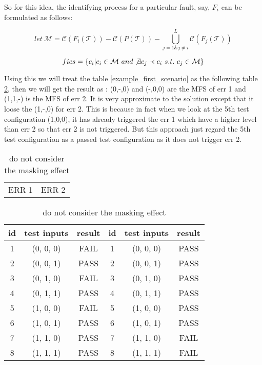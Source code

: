 \documentclass{sig-alternate}
\begin{document}
So for this idea, the identifying process for a particular fault, say, $F_{i}$ can be formulated as follows:

$$let\ \mathcal{M} = \mathcal{C}(F_{i}(\mathcal{T})) - \mathcal{C}(P(\mathcal{T})) - \bigcup_{j = 1 \& j \neq i }^{L}\mathcal{C}(F_{j}(\mathcal{T}))$$

$$fics = \{c_{i} | c_{i} \in \mathcal{M} \ and \not\exists c_{j} \prec c_{i}\ s.t.\ c_{j} \in \mathcal{M} \}$$

Using this we will treat the table \ref{example_first_scenario} as the following table \ref{simple_idea}, then we will get the result as : (0,-,0) and (-,0,0) are the MFS of err 1 and (1,1,-) is the MFS of err 2. It is very approximate to the solution except that it loose the (1,-,0) for err 2. This is because in fact when we look at the 5th test configuration (1,0,0), it has already triggered the err 1 which have a higher level than err 2 so that err 2 is not triggered. But this approach just regard the 5th test configuration as a passed test configuration as it does not trigger err 2.

\begin{table}
\centering
\caption{do not consider the masking effect}
\label{simple_idea}
\begin{tabular}{p{}|p{}} \hline
   ERR 1 & ERR 2
\end{tabular}

\begin{tabular}{c|c|c|c|c|c} \hline
id &test inputs & result & id&test inputs & result\\ \hline
1 &(0, 0, 0) &  FAIL &1&(0, 0, 0) &  PASS\\ \hline
2 &(0, 0, 1) &  PASS &2&(0, 0, 1) &  PASS\\ \hline
3 &(0, 1, 0) &  FAIL &3&(0, 1, 0) &  PASS\\ \hline
4 &(0, 1, 1) &  PASS &4&(0, 1, 1) &  PASS\\ \hline
5 &(1, 0, 0) &  FAIL &5&(1, 0, 0) &  PASS\\ \hline
6 &(1, 0, 1) &  PASS &6&(1, 0, 1) &  PASS\\ \hline
7 &(1, 1, 0) &  PASS &7&(1, 1, 0) &  FAIL\\ \hline
8 &(1, 1, 1) &  PASS &8&(1, 1, 1) &  FAIL\\ \hline
\hline\end{tabular}
\end{table}
\end{document}
